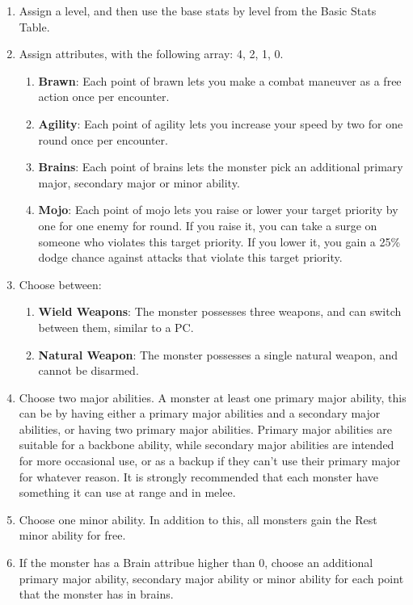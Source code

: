 \begin{enumerate}
\item Assign a level, and then use the base stats by level from the Basic Stats Table.
\item Assign attributes, with the following array: 4, 2, 1, 0.
\begin{enumerate}
\item \textbf{Brawn}: Each point of brawn lets you make a combat maneuver as a free action once per encounter.
\item \textbf{Agility}: Each point of agility lets you increase your speed by two for one round once per encounter.
\item \textbf{Brains}: Each point of brains lets the monster pick an additional primary major, secondary major or minor ability.
\item \textbf{Mojo}: Each point of mojo lets you raise or lower your target priority by one for one enemy for round. If you raise it, you can take a surge on someone who violates this target priority. If you lower it, you gain a 25\% dodge chance against attacks that violate this target priority.
\end{enumerate}
\item Choose between:
\begin{enumerate}
\item \textbf{Wield Weapons}: The monster possesses three weapons, and can switch between them, similar to a PC.
\item \textbf{Natural Weapon}: The monster possesses a single natural weapon, and cannot be disarmed.
\end{enumerate}
\item Choose two major abilities. A monster at least one primary major ability, this can be by having either a primary major abilities and a secondary major abilities, or having two primary major abilities. Primary major abilities are suitable for a backbone ability, while secondary major abilities are intended for more occasional use, or as a backup if they can't use their primary major for whatever reason. It is strongly recommended that each monster have something it can use at range and in melee.
\item Choose one minor ability. In addition to this, all monsters gain the Rest minor ability for free.
\item If the monster has a Brain attribue higher than 0, choose an additional primary major ability, secondary major ability or minor ability for each point that the monster has in brains.

\end{enumerate}
